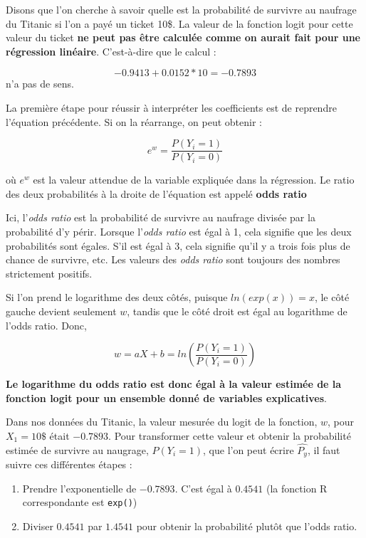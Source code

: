 \documentclass[
  french,
]{book}
\providecommand{\tightlist}{%
  \setlength{\itemsep}{0pt}\setlength{\parskip}{0pt}}
\begin{document}
Disons que l'on cherche à savoir quelle est la probabilité de survivre au naufrage du Titanic si l'on a payé un ticket 10\$. La valeur de la fonction logit pour cette valeur du ticket \textbf{ne peut pas être calculée comme on aurait fait pour une régression linéaire}. C'est-à-dire que le calcul :

\[-0.9413 + 0.0152*10 = -0.7893\] n'a pas de sens.

La première étape pour réussir à interpréter les coefficients est de reprendre l'équation précédente. Si on la réarrange, on peut obtenir :

\[ e^w = \frac{P(Y_i = 1)}{P(Y_i = 0)}\]

où \(e^w\) est la valeur attendue de la variable expliquée dans la régression. Le ratio des deux probabilités à la droite de l'équation est appelé \textbf{odds ratio}

Ici, l'\emph{odds ratio} est la probabilité de survivre au naufrage divisée par la probabilité d'y périr. Lorsque l'\emph{odds ratio} est égal à 1, cela signifie que les deux probabilités sont égales. S'il est égal à 3, cela signifie qu'il y a trois fois plus de chance de survivre, etc. Les valeurs des \emph{odds ratio} sont toujours des nombres strictement positifs.

Si l'on prend le logarithme des deux côtés, puisque \(ln(exp(x))=x\), le côté gauche devient seulement \(w\), tandis que le côté droit est égal au logarithme de l'odds ratio. Donc,

\[ w = aX+b = ln(\frac{P(Y_i = 1)}{P(Y_i = 0)})\]

\textbf{Le logarithme du odds ratio est donc égal à la valeur estimée de la fonction logit pour un ensemble donné de variables explicatives}.

Dans nos données du Titanic, la valeur mesurée du logit de la fonction, \(w\), pour \(X_1 = 10\$\) était \(-0.7893\). Pour transformer cette valeur et obtenir la probabilité estimée de survivre au naugrage, \(P(Y_i = 1)\), que l'on peut écrire \(\hat{P_y}\), il faut suivre ces différentes étapes :

\begin{enumerate}
\def\labelenumi{\arabic{enumi}.}
\tightlist
\item
  Prendre l'exponentielle de \(-0.7893\). C'est égal à \(0.4541\) (la fonction R correspondante est \texttt{exp()})
\item
  Diviser \(0.4541\) par \(1.4541\) pour obtenir la probabilité plutôt que l'odds ratio.
\end{enumerate}
\end{document}
